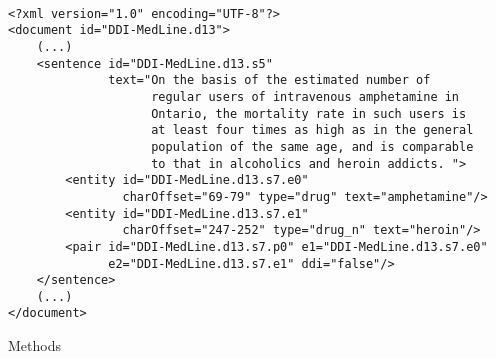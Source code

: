 \documentclass[xcolor={dvipsnames}]{beamer}
\begin{document}
\begin{frame}[fragile]{\insertsection}
\begin{verbatim}

<?xml version="1.0" encoding="UTF-8"?>
<document id="DDI-MedLine.d13">
    (...)
    <sentence id="DDI-MedLine.d13.s5" 
              text="On the basis of the estimated number of
                    regular users of intravenous amphetamine in
                    Ontario, the mortality rate in such users is 
                    at least four times as high as in the general 
                    population of the same age, and is comparable 
                    to that in alcoholics and heroin addicts. ">
        <entity id="DDI-MedLine.d13.s7.e0"
                charOffset="69-79" type="drug" text="amphetamine"/>
        <entity id="DDI-MedLine.d13.s7.e1"
                charOffset="247-252" type="drug_n" text="heroin"/>
        <pair id="DDI-MedLine.d13.s7.p0" e1="DDI-MedLine.d13.s7.e0"
              e2="DDI-MedLine.d13.s7.e1" ddi="false"/>
    </sentence>
    (...)
</document>
\end{verbatim}

\end{frame}

\begin{frame}[fragile]{\insertsection}

\begin{alertblock}{Methods}

\end{alertblock}

\end{frame}
\end{document}

